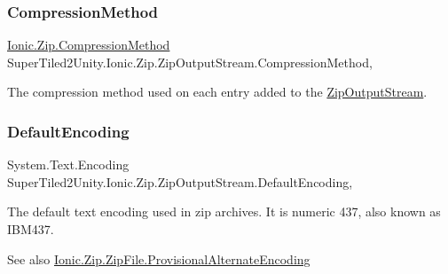 \subsubsection{\texorpdfstring{Compression\+Method}{CompressionMethod}}
{\footnotesize\ttfamily \mbox{\hyperlink{namespace_super_tiled2_unity_1_1_ionic_1_1_zip_a48fd7a4529dd87fb2fda54f62ae3d8a3}{Ionic.\+Zip.\+Compression\+Method}} Super\+Tiled2\+Unity.\+Ionic.\+Zip.\+Zip\+Output\+Stream.\+Compression\+Method\hspace{0.3cm}{\ttfamily [get]}, {\ttfamily [set]}}



The compression method used on each entry added to the \mbox{\hyperlink{class_super_tiled2_unity_1_1_ionic_1_1_zip_1_1_zip_output_stream}{Zip\+Output\+Stream}}. 

\mbox{\label{class_super_tiled2_unity_1_1_ionic_1_1_zip_1_1_zip_output_stream_a855d0c7107aa6a1176c06041e8695ce7}} 
\subsubsection{\texorpdfstring{Default\+Encoding}{DefaultEncoding}}
{\footnotesize\ttfamily System.\+Text.\+Encoding Super\+Tiled2\+Unity.\+Ionic.\+Zip.\+Zip\+Output\+Stream.\+Default\+Encoding\hspace{0.3cm}{\ttfamily [static]}, {\ttfamily [get]}}



The default text encoding used in zip archives. It is numeric 437, also known as I\+B\+M437. 

\begin{DoxySeeAlso}{See also}
\mbox{\hyperlink{class_super_tiled2_unity_1_1_ionic_1_1_zip_1_1_zip_file_aece3d00ca721d3d06020ecc44442ea1e}{Ionic.\+Zip.\+Zip\+File.\+Provisional\+Alternate\+Encoding}}


\end{DoxySeeAlso}
\mbox{\label{class_super_tiled2_unity_1_1_ionic_1_1_zip_1_1_zip_output_stream_a3e8855ff27cbafba7bb65b9839d6f803}} 
